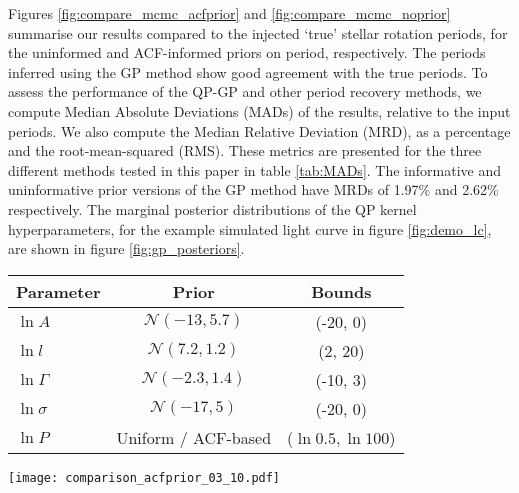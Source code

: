 \documentclass[a4paper,fleqn,usenatbib,useAMS]{mnras}
\newcommand{\naigrain}{333}
\newcommand{\percentgpMAD}{1.97}
\newcommand{\percentgpMADnp}{2.62}
\begin{document}
Figures \ref{fig:compare_mcmc_acfprior} and \ref{fig:compare_mcmc_noprior}
summarise our results compared to the injected `true' stellar rotation
periods, for the uninformed and ACF-informed priors on period, respectively.
The periods inferred using the GP method show good agreement with the true
periods.
To assess the performance of the QP-GP and other period recovery methods, we
compute Median Absolute Deviations (MADs) of the results, relative to the
input periods.
We also compute the Median Relative Deviation (MRD), as a percentage and the
root-mean-squared (RMS).
These metrics are presented for the three different methods tested in this
paper in table \ref{tab:MADs}.
The informative and uninformative prior versions of the GP method have MRDs of
\percentgpMAD \% and \percentgpMADnp \% respectively.
The marginal posterior distributions of the QP kernel hyperparameters, for the
example simulated light curve in figure \ref{fig:demo_lc}, are shown in
figure \ref{fig:gp_posteriors}.


\begin{table*}
\begin{center}
\caption{\label{tab:priors} Priors and bounds on the natural logarithms of
    the GP model parameters.}
\begin{tabular}{lcc}
Parameter & Prior & Bounds\\
    \hline
    $\ln A$ & $\mathcal N(-13, 5.7)$ & (-20, 0) \\
    $\ln l$ & $\mathcal N(7.2, 1.2)$ & (2, 20) \\
    $\ln \Gamma$ & $\mathcal N(-2.3, 1.4)$ & (-10, 3) \\
    $\ln \sigma$ & $\mathcal N(-17, 5)$ & (-20, 0) \\
    $\ln P $ & Uniform / ACF-based & ($\ln 0.5, \ln 100$) \\
\end{tabular}
\end{center}
\end{table*}

\begin{figure*}
\begin{center}
\texttt{[image: comparison\_acfprior\_03\_10.pdf]}
\caption{The `true' rotation periods used to generate \naigrain\
simulated light curves vs the rotation periods measured using the GP
technique with an informed, ACF-based prior.
    Points are coloured by the peak-to-peak amplitude of the light curve, as
    defined in \citet{Aigrain2015}.
Since the posterior PDFs of rotation periods are often non-Gaussian,
    the points plotted here are maximum {\it a-posteriori} results.
The uncertainties are the 16th and 84th percentiles.
In many cases, the uncertainties are under-estimated.
The ACF-informed prior on rotation period used to generate these results is
    described in \textsection \ref{sec:GP_prior}.
    }
\label{fig:compare_mcmc_acfprior}
\end{center}
\end{figure*}
\end{document}
